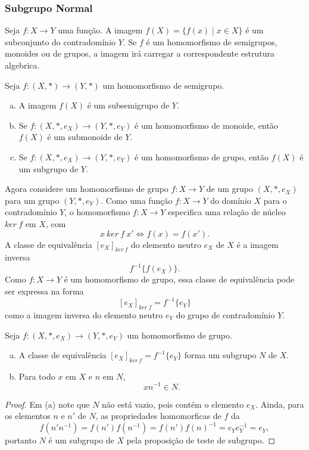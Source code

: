 \begin{definition}[Magma]
      \subsubsection{Subgrupo Normal}
         Seja $f: X\to Y$ uma função. A imagem $f(X) = \{f(x) \mid x \in X\}$ é um subconjunto do contradomínio $Y$.
         Se $f$ é um homomorfismo de semigrupos, monoides ou de grupos, a imagem irá carregar a correspondente estrutura algebrica.
         \begin{stat}
            Seja $f: (X,*) \to (Y,*)$ um homomorfismo de semigrupo.
            \begin{enumerate}[(a)]
               \item A imagem $f(X)$ é um subsemigrupo de $Y$.
               \item Se $f: (X,*,e_{X}) \to (Y,*,e_{Y})$ é um homomorfismo de monoide, então $f(X)$ é um submonoide de $Y$.
               \item Se $f: (X,*,e_{X}) \to (Y,*,e_{Y})$ é um homomorfismo de grupo, então $f(X)$ é um subgrupo de $Y$.
            \end{enumerate}
         \end{stat}
         Agora considere um homomorfismo de grupo $f:X\to Y$ de um grupo $(X,*,e_{X})$ para um grupo $(Y,*,e_{Y})$. Como uma função $f: X\to Y$ do domínio $X$ para o contradomínio $Y$, o homomorfismo $f: X\to Y$ especifica uma relação de núcleo $ker\ f$ em $X$, com
         $$ x\ ker\ f\ x' \Leftrightarrow f(x)=f(x').$$
         A classe de equivalência $[e_{X}]_{ker\ f}$ do elemento neutro $e_{X}$ de $X$ é a imagem inversa $$f^{-1}\{f(e_{X})\}.$$
         Como $f: X\to Y$ é um homomorfismo de grupo, essa classe de equivalência pode ser expressa na forma $$[e_{X}]_{ker\ f}=f^{-1}\{e_{Y}\}$$ como a imagem inversa do elemento neutro $e_{Y}$ do grupo de contradomínio $Y$.
         \begin{stat}
            Seja $f: (X,*,e_{X}) \to (Y,*,e_{Y})$ um homomorfismo de grupo.
            \begin{enumerate}[(a)]
               \item A classe de equivalência $[e_{X}]_{ker\ f}=f^{-1}\{e_{Y}\}$ forma um subgrupo $N$ de $X$.
               \item Para todo $x$ em $X$ e $n$ em $N$, $$xn^{-1} \in N.$$
            \end{enumerate}
            \begin{proof}
               Em (a) note que $N$ não está vazio, pois contém o elemento $e_{X}.$ Ainda, para os elementos $n$ e $n'$ de $N$, as propriedades homomorficas de $f$ da $$f(n'n^{-1})= f(n')f(n^{-1})=f(n')f(n)^{-1}=e_{Y}e_{Y}^{-1}=e_{Y},$$ portanto $N$ é um subgrupo de $X$ pela proposição de teste de subgrupo.


\end{proof}
\end{stat}
\end{definition}
